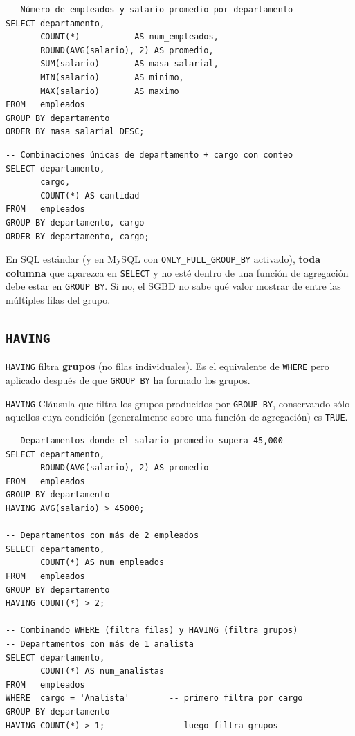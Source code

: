 \begin{lstlisting}[caption={GROUP BY con funciones de agregación.}]
-- Número de empleados y salario promedio por departamento
SELECT departamento,
       COUNT(*)           AS num_empleados,
       ROUND(AVG(salario), 2) AS promedio,
       SUM(salario)       AS masa_salarial,
       MIN(salario)       AS minimo,
       MAX(salario)       AS maximo
FROM   empleados
GROUP BY departamento
ORDER BY masa_salarial DESC;
\end{lstlisting}

\begin{lstlisting}[caption={GROUP BY con múltiples columnas.}]
-- Combinaciones únicas de departamento + cargo con conteo
SELECT departamento,
       cargo,
       COUNT(*) AS cantidad
FROM   empleados
GROUP BY departamento, cargo
ORDER BY departamento, cargo;
\end{lstlisting}

\begin{nota}
En SQL estándar (y en MySQL con \texttt{ONLY\_FULL\_GROUP\_BY}
activado), \textbf{toda columna} que aparezca en \texttt{SELECT}
y no esté dentro de una función de agregación debe estar en
\texttt{GROUP BY}.
Si no, el SGBD no sabe qué valor mostrar de entre las múltiples
filas del grupo.
\end{nota}

\subsection{\texttt{HAVING}}

\texttt{HAVING} filtra \textbf{grupos} (no filas individuales).
Es el equivalente de \texttt{WHERE} pero aplicado después de que
\texttt{GROUP BY} ha formado los grupos.

\begin{definicion}{\texttt{HAVING}}
Cláusula que filtra los grupos producidos por \texttt{GROUP BY},
conservando sólo aquellos cuya condición (generalmente sobre
una función de agregación) es \texttt{TRUE}.
\end{definicion}

\begin{lstlisting}[caption={HAVING: filtrar grupos por condición agregada.}]
-- Departamentos donde el salario promedio supera 45,000
SELECT departamento,
       ROUND(AVG(salario), 2) AS promedio
FROM   empleados
GROUP BY departamento
HAVING AVG(salario) > 45000;

-- Departamentos con más de 2 empleados
SELECT departamento,
       COUNT(*) AS num_empleados
FROM   empleados
GROUP BY departamento
HAVING COUNT(*) > 2;

-- Combinando WHERE (filtra filas) y HAVING (filtra grupos)
-- Departamentos con más de 1 analista
SELECT departamento,
       COUNT(*) AS num_analistas
FROM   empleados
WHERE  cargo = 'Analista'        -- primero filtra por cargo
GROUP BY departamento
HAVING COUNT(*) > 1;             -- luego filtra grupos
\end{lstlisting}

